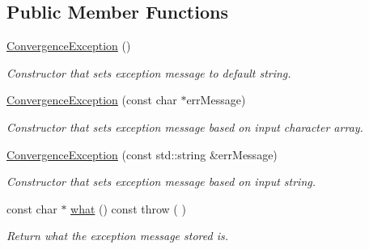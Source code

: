 \subsection*{Public Member Functions}
\begin{DoxyCompactItemize}
\item 
\hyperlink{structtudat_1_1basic__mathematics_1_1ConvergenceException_a6fbd7c9e9111630ff59887df5f01dd4b}{Convergence\+Exception} ()\hypertarget{structtudat_1_1basic__mathematics_1_1ConvergenceException_a6fbd7c9e9111630ff59887df5f01dd4b}{}\label{structtudat_1_1basic__mathematics_1_1ConvergenceException_a6fbd7c9e9111630ff59887df5f01dd4b}

\begin{DoxyCompactList}\small\item\em Constructor that sets exception message to default string. \end{DoxyCompactList}\item 
\hyperlink{structtudat_1_1basic__mathematics_1_1ConvergenceException_af5beda64cf5e208699380c5d30cec2cc}{Convergence\+Exception} (const char $\ast$err\+Message)\hypertarget{structtudat_1_1basic__mathematics_1_1ConvergenceException_af5beda64cf5e208699380c5d30cec2cc}{}\label{structtudat_1_1basic__mathematics_1_1ConvergenceException_af5beda64cf5e208699380c5d30cec2cc}

\begin{DoxyCompactList}\small\item\em Constructor that sets exception message based on input character array. \end{DoxyCompactList}\item 
\hyperlink{structtudat_1_1basic__mathematics_1_1ConvergenceException_a59da788f455791773cff49adef6400db}{Convergence\+Exception} (const std\+::string \&err\+Message)\hypertarget{structtudat_1_1basic__mathematics_1_1ConvergenceException_a59da788f455791773cff49adef6400db}{}\label{structtudat_1_1basic__mathematics_1_1ConvergenceException_a59da788f455791773cff49adef6400db}

\begin{DoxyCompactList}\small\item\em Constructor that sets exception message based on input string. \end{DoxyCompactList}\item 
const char $\ast$ \hyperlink{structtudat_1_1basic__mathematics_1_1ConvergenceException_ab661c40e02743b3b9636beecd48818aa}{what} () const   throw ( )\hypertarget{structtudat_1_1basic__mathematics_1_1ConvergenceException_ab661c40e02743b3b9636beecd48818aa}{}\label{structtudat_1_1basic__mathematics_1_1ConvergenceException_ab661c40e02743b3b9636beecd48818aa}

\begin{DoxyCompactList}\small\item\em Return what the exception message stored is. \end{DoxyCompactList}\end{DoxyCompactItemize}


